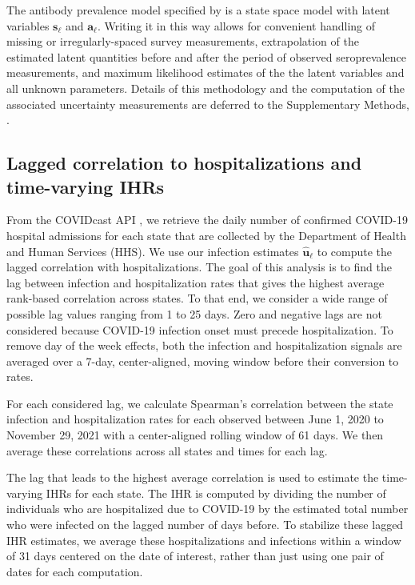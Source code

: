     
The antibody prevalence model specified by
 is a state space model with
latent variables $\mathbf{s}_{\ell}$ and $\mathbf{a}_{\ell}$. Writing it in this
way allows for convenient handling of missing or irregularly-spaced survey
measurements, extrapolation of the estimated latent quantities before and after
the period of observed seroprevalence measurements, and maximum likelihood
estimates of the the latent variables and all unknown parameters. Details of
this methodology and the computation of the associated uncertainty measurements
are deferred to the Supplementary Methods, .



\subsection{Lagged correlation to hospitalizations and time-varying IHRs} 
\label{sec:ihr-calculations}

From the COVIDcast API \citep{reinhart2021open}, we retrieve the daily number of
confirmed COVID-19 hospital admissions for each state that are collected by the
\US Department of Health and Human Services (HHS). We use our infection
estimates $\mathbf{\widehat{u}}_\ell$ to compute the lagged correlation with 
hospitalizations. The goal of this analysis is to find the lag between
infection and hospitalization rates that gives the highest average rank-based
correlation across \US states. To that end, we consider a wide range of possible
lag values ranging from 1 to 25 days. Zero and negative lags are not considered
because COVID-19 infection onset must precede hospitalization.
To remove day of the week effects, both the infection and hospitalization
signals are averaged over a 7-day, center-aligned, moving window before their
conversion to rates.

For each considered lag, we calculate Spearman's correlation between the state
infection and hospitalization rates for each observed between June 1, 2020 to
November 29, 2021 with a center-aligned rolling window of 61 days. We then
average these correlations across all states and times for each lag. 

The lag that leads to the highest average correlation is used to estimate the
time-varying IHRs for each state. The IHR is computed by dividing the number of
individuals who are hospitalized due to COVID-19 by the estimated total number
who were infected on the lagged number of days before. To stabilize these lagged
IHR estimates, we average these hospitalizations and infections within a window
of 31 days centered on the date of interest, rather than just using one pair of
dates for each computation.
